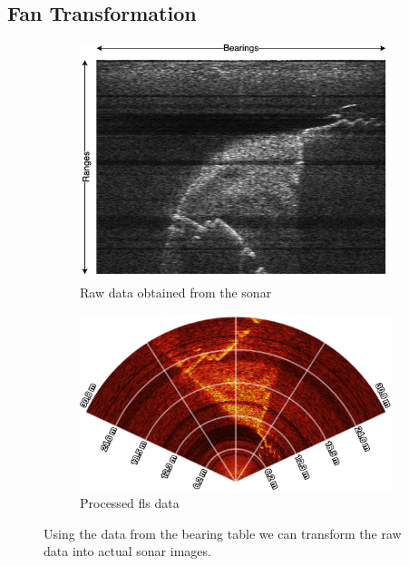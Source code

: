 \subsection{Fan Transformation}
\label{sec:fan-tform}
\begin{figure}[H]
    \centering
    \begin{subfigure}[b]{.45\textwidth}
        \centering
        \includegraphics[width=\textwidth]{figures/sonar_raw_annotated.png}
        \caption[\acrshort{fls} raw data]{Raw data obtained from the sonar}
        \label{sfig:sonarraw}
    \end{subfigure}
    \hfill
    \begin{subfigure}[b]{.45\textwidth}
        \centering
        \includegraphics[width=\textwidth]{figures/sonar_processed.png}
        \caption{Processed \acrshort{fls} data}
        \label{sfig:sonarfan}
    \end{subfigure}
    \caption{Using the data from the bearing table we can transform the raw data into actual sonar images.}
\end{figure}

